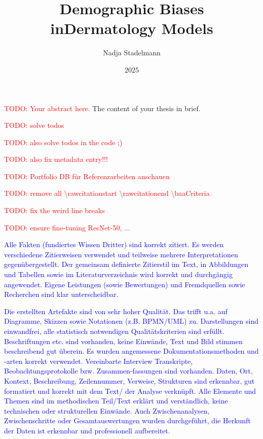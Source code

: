 \documentclass[12pt, a4paper, oneside]{book}   	%
\author{Nadja Stadelmann}                       %
\title{Demographic Biases in\linebreak Dermatology Models}   %
\subtitle{\large \todo{subtitle}}               %
\date{2025}                                     %
\renewcommand{\todo}[1]{\textcolor{red}{TODO: #1}}
\newcommand{\baaCriteria}[1]{\textcolor{blue}{#1}}
\begin{document}
	\english                                        %
	\maketitle
	
	
	\begin{abstractstyle}{\hsummary}
		\todo{Your abstract here.}
	    The content of your thesis in brief.
	\end{abstractstyle}
	
	\tableofcontents
	
	\listoftodos
	\todo{solve todos} 
	
	
	\todo{also solve todos in the code ;)} 
	
	
	\todo{also fix metadata entry!!!} 
	
	
	\todo{Portfolio DB für Referenzarbeiten anschauen}
	
	\todo{remove all \textbackslash rawcitationstart \textbackslash rawcitationend  \textbackslash baaCriteria}
	
	\todo{fix the weird line breaks}
	
	\todo{ensure fine-tuning ResNet-50, ...}
	
	
	\baaCriteria{Alle Fakten (fundiertes Wissen Dritter) sind korrekt zitiert. Es werden verschiedene Zitierweisen verwendet und teilweise mehrere Interpretationen gegenübergestellt. Der gemeinsam definierte Zitierstil im Text, in Abbildungen und Tabellen sowie im Literaturverzeichnis wird korrekt und durchgängig angewendet. Eigene Leistungen (sowie Bewertungen) und Fremdquellen sowie Recherchen sind klar unterscheidbar.} 
	
	
	\baaCriteria{Die erstellten Artefakte sind von sehr hoher Qualität. Das trifft u.a. auf Diagramme, Skizzen sowie Notationen (z.B. BPMN/UML) zu. Darstellungen sind einwandfrei, alle statistisch notwendigen Qualitätskriterien sind erfüllt. Beschriftungen etc. sind vorhanden, keine Einwände, Text und Bild stimmen beschreibend gut überein. Es wurden angemessene Dokumentationsmethoden und -arten korrekt verwendet. Vereinbarte Interview Transkripte, Beobachtungsprotokolle bzw. Zusammen-fassungen sind vorhanden. Daten, Ort, Kontext, Beschreibung, Zeilennummer, Verweise, Strukturen sind erkennbar, gut formatiert und korrekt mit dem Text/ der Analyse verknüpft. Alle Elemente und Themen sind im methodischen Teil/Text erklärt und verständlich, keine technischen oder strukturellen Einwände. Auch Zwischenanalysen, Zwischenschritte oder Gesamtauswertungen wurden durchgeführt, die Herkunft der Daten ist erkennbar und professionell aufbereitet.} 
	
\end{document}
